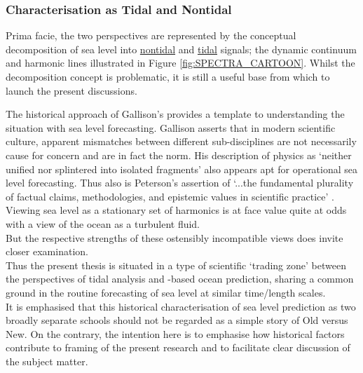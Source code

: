 \subsubsection{Characterisation as Tidal and Nontidal}

\BoxBegin
Prima facie, the two perspectives are represented by the conceptual decomposition of sea level into \underline{nontidal} and \underline{tidal} signals;  the dynamic continuum and harmonic lines illustrated in Figure \ref{fig:SPECTRA_CARTOON}.  Whilst the decomposition concept is problematic, it is still a useful base from which to launch the present discussions.   
\BoxEnd


The historical approach of Gallison's \citep{Galison:1987wh} provides a template to understanding the situation with sea level forecasting.  Gallison asserts that in modern scientific culture, apparent mismatches between different sub-disciplines are not necessarily cause for concern and are in fact the norm.  His description of physics as `neither unified nor splintered into isolated fragments' \citep[pp 782]{Galison:1987wh} also appears apt for operational sea level forecasting.  Thus also is Peterson's assertion of `...the fundamental plurality of factual claims, methodologies, and epistemic values in scientific practice' \cite{Petersen:2012tr}.  Viewing sea level as a stationary set of harmonics is at face value quite at odds with a view of the ocean as a turbulent fluid.\\
But the respective strengths of these ostensibly incompatible views does invite closer examination. \\
Thus the present thesis is situated in a type of scientific `trading zone' between the perspectives of tidal analysis and \OGCM{}-based ocean prediction, sharing a common ground in the routine forecasting of sea level at similar time/length scales.\\



It is emphasised that this historical characterisation of sea level prediction as two broadly separate schools should not be regarded as a simple story of Old versus New.  On the contrary, the intention here is to emphasise how historical factors contribute to framing of the present research and to facilitate clear discussion of the subject matter.







